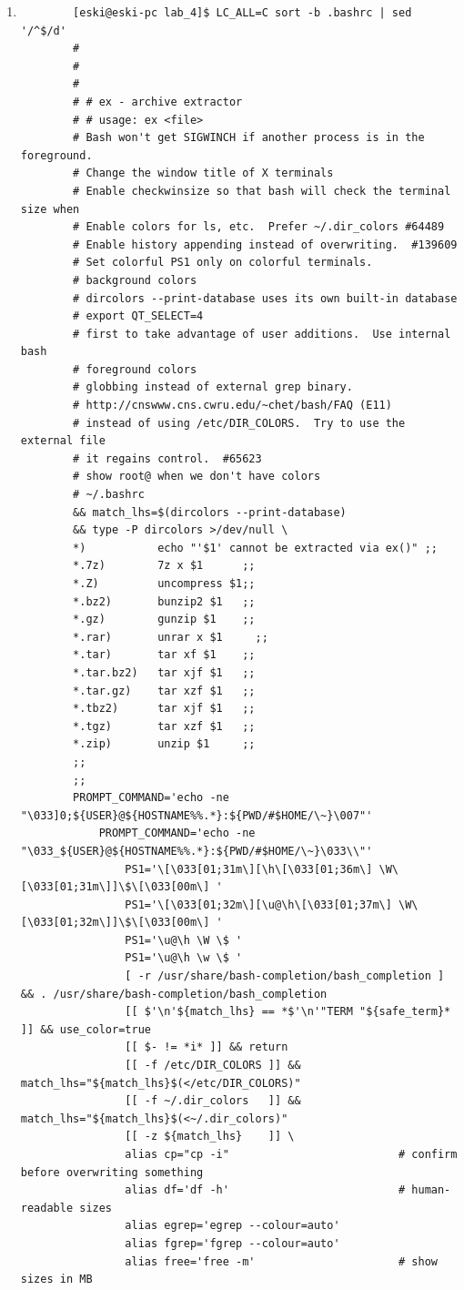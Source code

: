 \documentclass{article}
\begin{document}
\begin{enumerate}
		\newpage
		\item\begin{verbatim}	
		[eski@eski-pc lab_4]$ LC_ALL=C sort -b .bashrc | sed '/^$/d' 
		#
		#
		#
		# # ex - archive extractor
		# # usage: ex <file>
		# Bash won't get SIGWINCH if another process is in the foreground.
		# Change the window title of X terminals
		# Enable checkwinsize so that bash will check the terminal size when
		# Enable colors for ls, etc.  Prefer ~/.dir_colors #64489
		# Enable history appending instead of overwriting.  #139609
		# Set colorful PS1 only on colorful terminals.
		# background colors
		# dircolors --print-database uses its own built-in database
		# export QT_SELECT=4
		# first to take advantage of user additions.  Use internal bash
		# foreground colors
		# globbing instead of external grep binary.
		# http://cnswww.cns.cwru.edu/~chet/bash/FAQ (E11)
		# instead of using /etc/DIR_COLORS.  Try to use the external file
		# it regains control.  #65623
		# show root@ when we don't have colors
		# ~/.bashrc
		&& match_lhs=$(dircolors --print-database)
		&& type -P dircolors >/dev/null \
		*)           echo "'$1' cannot be extracted via ex()" ;;
		*.7z)        7z x $1      ;;
		*.Z)         uncompress $1;;
		*.bz2)       bunzip2 $1   ;;
		*.gz)        gunzip $1    ;;
		*.rar)       unrar x $1     ;;
		*.tar)       tar xf $1    ;;
		*.tar.bz2)   tar xjf $1   ;;
		*.tar.gz)    tar xzf $1   ;;
		*.tbz2)      tar xjf $1   ;;
		*.tgz)       tar xzf $1   ;;
		*.zip)       unzip $1     ;;
		;;
		;;
		PROMPT_COMMAND='echo -ne "\033]0;${USER}@${HOSTNAME%%.*}:${PWD/#$HOME/\~}\007"'
			PROMPT_COMMAND='echo -ne "\033_${USER}@${HOSTNAME%%.*}:${PWD/#$HOME/\~}\033\\"'
				PS1='\[\033[01;31m\][\h\[\033[01;36m\] \W\[\033[01;31m\]]\$\[\033[00m\] '
				PS1='\[\033[01;32m\][\u@\h\[\033[01;37m\] \W\[\033[01;32m\]]\$\[\033[00m\] '
				PS1='\u@\h \W \$ '
				PS1='\u@\h \w \$ '
				[ -r /usr/share/bash-completion/bash_completion ] && . /usr/share/bash-completion/bash_completion
				[[ $'\n'${match_lhs} == *$'\n'"TERM "${safe_term}* ]] && use_color=true
				[[ $- != *i* ]] && return
				[[ -f /etc/DIR_COLORS ]] && match_lhs="${match_lhs}$(</etc/DIR_COLORS)"
				[[ -f ~/.dir_colors   ]] && match_lhs="${match_lhs}$(<~/.dir_colors)"
				[[ -z ${match_lhs}    ]] \
				alias cp="cp -i"                          # confirm before overwriting something
				alias df='df -h'                          # human-readable sizes
				alias egrep='egrep --colour=auto'
				alias fgrep='fgrep --colour=auto'
				alias free='free -m'                      # show sizes in MB

\end{verbatim}
\end{enumerate}
\end{document}
